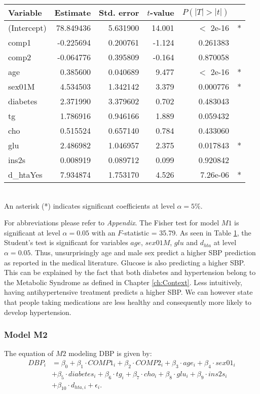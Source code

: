 \begin{table}
\centering
{}
\begin{tabular}{lrrrrl}
\toprule
Variable & Estimate & Std. error & $t$-value & $P(|T|>|t|)$ &\\
\midrule
(Intercept)& 78.849436 &  5.631900& 14.001 & $<$ 2e-16&*  \\
comp1    &   -0.225694  & 0.200761&  -1.124 &0.261383   &  \\
comp2  &     -0.064776  & 0.395809 & -0.164& 0.870058   &  \\
age      &    0.385600  & 0.040689 &  9.477 & $<$ 2e-16&* \\
sex01M    &   4.534503   &1.342142 &  3.379 &0.000776&*  \\
diabetes   &  2.371990  & 3.379602 &  0.702 &0.483043   &  \\
tg     &      1.786916 &  0.946166  & 1.889 &0.059432  &\\
cho       &   0.515524  & 0.657140 &  0.784 &0.433060  &  \\ 
glu         & 2.486982 &  1.046957  & 2.375& 0.017843&*  \\
ins2s    &   0.008919  & 0.089712 &  0.099& 0.920842 &  \\  
d\_htaYes    & 7.934874  & 1.753170 &  4.526& 7.26e-06&*  \\
\bottomrule
\end{tabular}
\label{table:betasm1} \\
{\footnotesize An asterisk (*) indicates significant coefficients at level $\alpha=5\%$.}
\end{table}

For abbreviations please refer to \emph{Appendix}. The Fisher test for model $M1$ is significant at level $\alpha=0.05$ with an $F$-statistic = 35.79. As seen in Table \ref{table:betasm1}, the Student's test is significant for variables $age$, $sex01M$, $glu$ and $d_{hta}$ at level $\alpha=0.05$. Thus, unsurprisingly age and male sex predict a higher SBP prediction as reported in the medical literature. Glucose is also predicting a higher SBP. This can be explained by the fact that both diabetes and hypertension belong to the Metabolic Syndrome as defined in Chapter \ref{ch:Context}. Less intuitively, having antihypertensive treatment predicts a higher SBP. We can however state that people taking medications are less healthy and consequently more likely to develop hypertension.

\subsubsection{Model M2}
The equation of $M2$ modeling DBP is given by:
\begin{align*}
DBP_i &=  \beta_0 + \beta_1 \cdot COMP1_i+ \beta_2 \cdot COMP2_i + \beta_3 \cdot age_i + \beta_4 \cdot sex01_i  \\
& +\beta_5 \cdot diabetes_i +\beta_6 \cdot tg_i +\beta_7 \cdot cho_i +\beta_8 \cdot glu_i +\beta_9 \cdot ins2s_i \\
&+ \beta_{10} \cdot d_{hta,i}+ \epsilon_i.
\end{align*}

